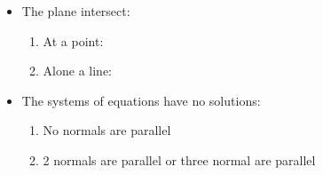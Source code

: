 \documentclass[12pt, a4paper]{article}
\begin{document}
\begin{enumerate}
\begin{itemize}
    \item The plane intersect: 
    \begin{enumerate}
      \item At a point: {\color{green}{the system of equations will have a unique solution.}}
      \item Alone a line: {\color{green}{the system of equations will have infinitely many solutions}}
    \end{enumerate}
    \item The systems of equations have no solutions: 
    \begin{enumerate}
      \item No normals are parallel {\color{green}{(the planes from a prism)}}
      \item 2 normals are parallel or three normal are parallel {\color{green}{(the planes are parallel)}}
    \end{enumerate}
  \end{itemize}
\end{enumerate}
\end{document}

